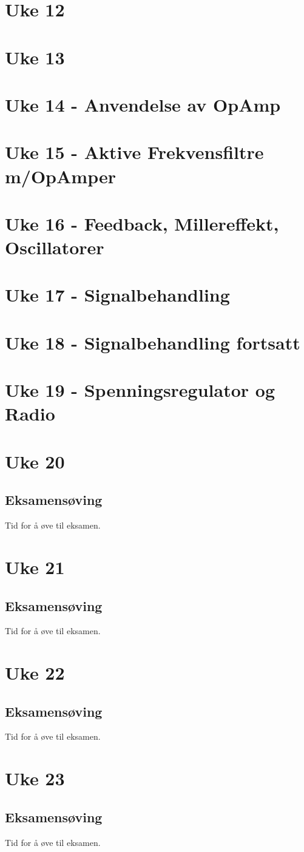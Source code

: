 \documentclass{article}
\begin{document}
  \section{Uke 12}
    
  \section{Uke 13}
    
  \section{Uke 14 - Anvendelse av OpAmp}
    
  \section{Uke 15 - Aktive Frekvensfiltre m/OpAmper}
    
  \section{Uke 16 - Feedback, Millereffekt, Oscillatorer}
    
  \section{Uke 17 - Signalbehandling}
    
  \section{Uke 18 - Signalbehandling fortsatt}
    
  \section{Uke 19 - Spenningsregulator og Radio}
    
  \section{Uke 20}
    \subsection{Eksamensøving}
      Tid for å øve til eksamen.
  \section{Uke 21}
    \subsection{Eksamensøving}
      Tid for å øve til eksamen.
  \section{Uke 22}
    \subsection{Eksamensøving}
      Tid for å øve til eksamen.
  \section{Uke 23}
    \subsection{Eksamensøving}
      Tid for å øve til eksamen.
\end{document}
